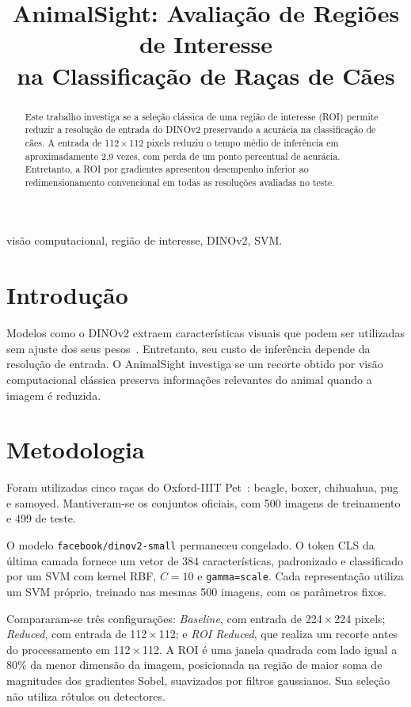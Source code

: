 \documentclass[conference]{IEEEtran}
\title{AnimalSight: Avaliação de Regiões de Interesse\\
na Classificação de Raças de Cães}
\author{
\IEEEauthorblockN{João Meyer Muhlmann}
\IEEEauthorblockA{Universidade Federal do Paraná\\
Trabalho Final de Visão Computacional\\
Novembro de 2026}
}
\begin{document}
\maketitle

\begin{abstract}
Este trabalho investiga se a seleção clássica de uma região de interesse
(ROI) permite reduzir a resolução de entrada do DINOv2 preservando a
acurácia na classificação de cães. A entrada de 112\,$\times$\,112 pixels
reduziu o tempo médio de inferência em aproximadamente 2,9 vezes, com
perda de um ponto percentual de acurácia. Entretanto, a ROI por
gradientes apresentou desempenho inferior ao redimensionamento
convencional em todas as resoluções avaliadas no teste.
\end{abstract}

\begin{IEEEkeywords}
visão computacional, região de interesse, DINOv2, SVM.
\end{IEEEkeywords}

\section{Introdução}
Modelos como o DINOv2 extraem características visuais que podem ser
utilizadas sem ajuste dos seus pesos~\cite{dinov2}. Entretanto, seu custo
de inferência depende da resolução de entrada. O AnimalSight investiga
se um recorte obtido por visão computacional clássica preserva
informações relevantes do animal quando a imagem é reduzida.

\section{Metodologia}
Foram utilizadas cinco raças do Oxford-IIIT Pet~\cite{pets}: beagle,
boxer, chihuahua, pug e samoyed. Mantiveram-se os conjuntos oficiais,
com 500 imagens de treinamento e 499 de teste.

O modelo \texttt{facebook/dinov2-small} permaneceu congelado. O token
CLS da última camada fornece um vetor de 384 características,
padronizado e classificado por um SVM com kernel RBF, $C=10$ e
\texttt{gamma=scale}. Cada representação utiliza um SVM próprio,
treinado nas mesmas 500 imagens, com os parâmetros fixos.

Compararam-se três configurações: \textit{Baseline}, com entrada de
224\,$\times$\,224 pixels; \textit{Reduced}, com entrada de
112\,$\times$\,112; e \textit{ROI Reduced}, que realiza um recorte antes
do processamento em 112\,$\times$\,112. A ROI é uma janela quadrada com
lado igual a 80\% da menor dimensão da imagem, posicionada na região
de maior soma de magnitudes dos gradientes Sobel, suavizados por
filtros gaussianos. Sua seleção não utiliza rótulos ou detectores.
\end{document}
